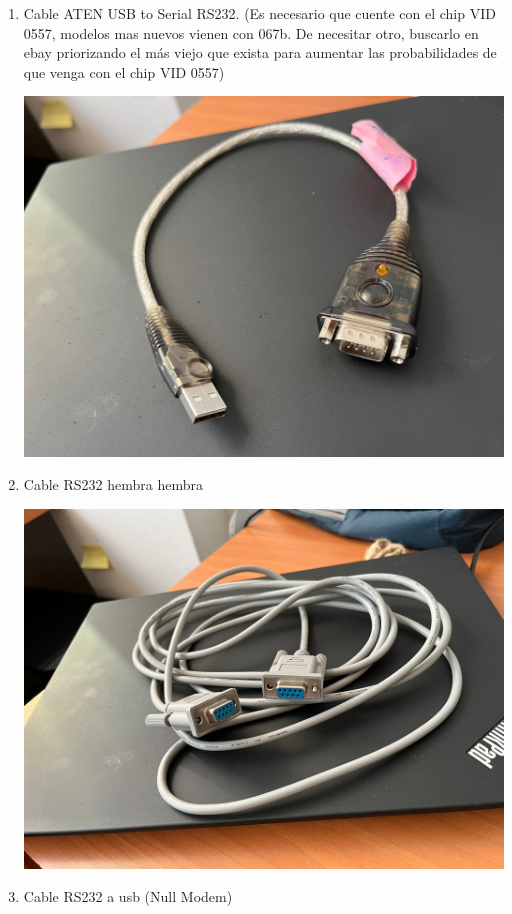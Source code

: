 \documentclass{article}
\begin{document}
\begin{enumerate}
	\item Cable ATEN USB to Serial RS232.  (Es necesario que cuente con el chip VID 0557, modelos mas nuevos vienen con 067b. De necesitar otro, buscarlo en ebay priorizando el más viejo que exista para aumentar las probabilidades de que venga con el chip VID 0557)

	\includegraphics*[scale=0.12]{img/ATEN_USB.jpeg}
	\item  Cable RS232 hembra hembra 

	\includegraphics*[scale=0.12]{img/rs232_hembra_hembra.jpeg}
	\item Cable RS232 a usb (Null Modem)


\end{enumerate}
\end{document}
